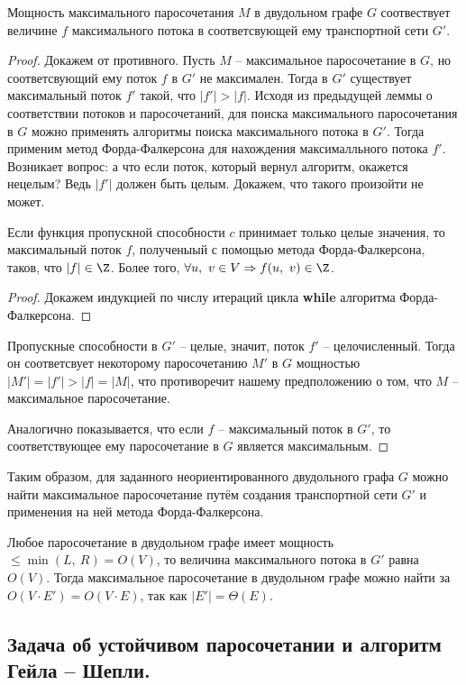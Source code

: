 \documentclass[a4paper,12pt]{article}
\begin{document}
\begin{consequence}
 Мощность максимального паросочетания $M$ в двудольном графе $G$ соотвествует величине $f$ максимального потока в соответсвующей ему транспортной сети $G'$.
\end{consequence}
\begin{proof}
Докажем от противного. Пусть $M$ -- максимальное паросочетание в $G$, но соответсвующий ему поток $f$ в $G'$ не максимален. Тогда в $G'$ существует максимальный поток $f'$ такой, что $|f'| > |f|$. Исходя из предыдущей леммы о соответствии потоков и паросочетаний, для поиска максимального паросочетания в $G$ можно применять алгоритмы поиска максимального потока в $G'$. Тогда применим метод Форда-Фалкерсона для нахождения максималльного потока $f'$. Возникает вопрос: а что если поток, который вернул алгоритм, окажется нецелым? Ведь $|f'|$ должен быть целым. Докажем, что такого произойти не может.
\begin{theorem}
 Если функция пропускной способности $c$ принимает только целые значения, то максимальный поток $f$, полученыый с помощью метода Форда-Фалкерсона, таков, что $|f| \in \Z$. Более того, $\forall u,\ v \in V \Rightarrow f(u,\ v) \in \Z$.
\end{theorem}
\begin{proof}
Докажем индукцией по числу итераций цикла \textbf{while} алгоритма Форда-Фалкерсона.
\end{proof}
Пропускные способности в $G'$ -- целые, значит, поток $f'$ -- целочисленный. Тогда он соответсвует некоторому паросочетанию $M'$ в $G$ мощностью $|M'| = |f'| > |f| = |M|$, что противоречит нашему предположению о том, что $M$ -- максимальное паросочетание.

Аналогично показывается, что если $f$ -- максимальный поток в $G'$, то соответствующее ему паросочетание в $G$ является максимальным.
\end{proof}

Таким образом, для заданного неориентированного двудольного графа $G$ можно найти максимальное паросочетание путём создания транспортной сети $G'$ и применения на ней метода Форда-Фалкерсона.

Любое паросочетание в двудольном графе имеет мощность $\leqslant \min(L,\ R) = O(V)$, то величина максимального потока в $G'$ равна $O(V)$. Тогда максимальное паросочетание в двудольном графе можно найти за $O(V\cdot E') = O(V \cdot E)$, так как $|E'| = \Theta(E)$.

\subsection{Задача об устойчивом паросочетании и алгоритм Гейла – Шепли.}
\end{document}
